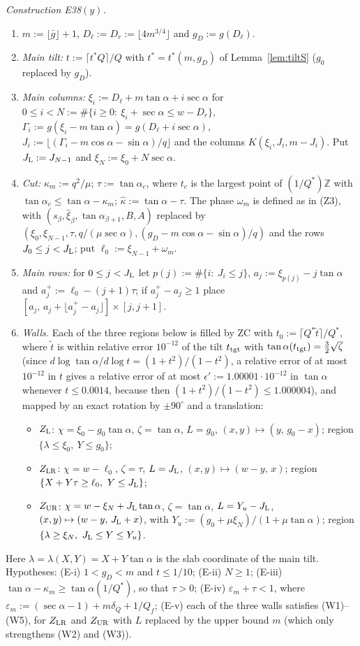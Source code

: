 \documentclass[11pt]{amsart}
\newcommand{\Z}{\mathbb Z}
\newcommand{\ca}{\cos\alpha}
\newcommand{\sa}{\sin\alpha}
\newcommand{\ta}{\tan\alpha}
\newcommand{\se}{\sec\alpha}
\theoremstyle{definition}
\theoremstyle{remark}
\numberwithin{equation}{section}
\begin{document}
\emph{Construction E38$(y)$.}
\begin{enumerate}[label=(E\arabic*)]
\item $m:=\lfloor\bar g\rfloor+1$, $D_\ell:=D_r:=\lfloor4m^{3/4}\rfloor$ and $g_D:=g(D_\ell)$.
\item \emph{Main tilt:} $t:=\lceil t^*Q\rceil/Q$ with $t^*=t^*(m,g_D)$ of Lemma~\ref{lem:tiltS} ($g_0$ replaced by
$g_D$).
\item \emph{Main columns:} $\xi_i:=D_\ell+m\ta+i\se$ for $0\le i<N:=\#\{i\ge0:\ \xi_i+\se\le w-D_r\}$,
$\Gamma_i:=g(\xi_i-m\ta)=g(D_\ell+i\se)$, $J_i:=\lfloor(\Gamma_i-m\ca-\sa)/q\rfloor$ and the columns
$K(\xi_i,J_i,m-J_i)$. Put $J_{\rm L}:=J_{N-1}$ and $\xi_N:=\xi_0+N\se$.
\item \emph{Cut:} $\kappa_m:=q^2/\mu$; $\tau:=\tan\alpha_c$, where $t_c$ is the largest point of $(1/Q^*)\Z$ with
$\tan\alpha_c\le\ta-\kappa_m$; $\hat\kappa:=\ta-\tau$. The phase $\omega_m$ is defined as in (Z3), with
$(s_\beta,\hat\xi_\beta,\tan\alpha_{\beta+1},B,A)$ replaced by $(\xi_0,\xi_{N-1},\tau,q/(\mu\se),(g_D-m\ca-\sa)/q)$ and
the rows $J_0\le j<J_{\rm L}$; put $\ell_0:=\xi_{N-1}+\omega_m$.
\item \emph{Main rows:} for $0\le j<J_{\rm L}$ let $p(j):=\#\{i:\ J_i\le j\}$, $a_j:=\xi_{p(j)}-j\ta$ and
$a_j^+:=\ell_0-(j+1)\tau$; if $a_j^+-a_j\ge1$ place $[a_j,\,a_j+\lfloor a_j^+-a_j\rfloor]\times[j,j+1]$.
\item \emph{Walls.} Each of the three regions below is filled by ZC with $t_0:=\lceil Q^*\tilde t\rceil/Q^*$, where
$\tilde t$ is within relative error $10^{-12}$ of the tilt $t_{\rm tgt}$ with $\tan\alpha(t_{\rm tgt})=\frac32\sqrt\zeta$
(since $d\log\ta/d\log t=(1+t^2)/(1-t^2)$, a relative error of at most $10^{-12}$ in $t$ gives a relative error of at
most $\epsilon':=1.00001\cdot10^{-12}$ in $\ta$ whenever $t\le0.0014$, because then $(1+t^2)/(1-t^2)\le1.000004$), and
mapped by an exact rotation by $\pm90^\circ$ and a translation:
\begin{itemize}
\item $Z_{\rm L}$: $\chi=\xi_0-g_0\ta$, $\zeta=\ta$, $L=g_0$, $(x,y)\mapsto(y,\,g_0-x)$; region
$\{\lambda\le\xi_0,\ Y\le g_0\}$;
\item $Z_{\rm LR}$: $\chi=w-\ell_0$, $\zeta=\tau$, $L=J_{\rm L}$, $(x,y)\mapsto(w-y,\,x)$; region
$\{X+Y\tau\ge\ell_0,\ Y\le J_{\rm L}\}$;
\item $Z_{\rm UR}$: $\chi=w-\xi_N+J_{\rm L}\ta$, $\zeta=\ta$, $L=Y_u-J_{\rm L}$, $(x,y)\mapsto(w-y,\,J_{\rm L}+x)$, with
$Y_u:=(g_0+\mu\xi_N)/(1+\mu\ta)$; region $\{\lambda\ge\xi_N,\ J_{\rm L}\le Y\le Y_u\}$.
\end{itemize}
\end{enumerate}
Here $\lambda=\lambda(X,Y)=X+Y\ta$ is the slab coordinate of the main tilt. Hypotheses:
(E-i) $1<g_D<m$ and $t\le1/10$; (E-ii) $N\ge1$; (E-iii) $\ta-\kappa_m\ge\tan\alpha(1/Q^*)$, so that $\tau>0$;
(E-iv) $\varepsilon_m+\tau<1$, where $\varepsilon_m:=(\se-1)+m\delta_Q+1/Q_f$; (E-v) each of the three walls satisfies
(W1)--(W5), for $Z_{\rm LR}$ and $Z_{\rm UR}$ with $L$ replaced by the upper bound $m$ (which only strengthens (W2) and
(W3)).
\end{document}
